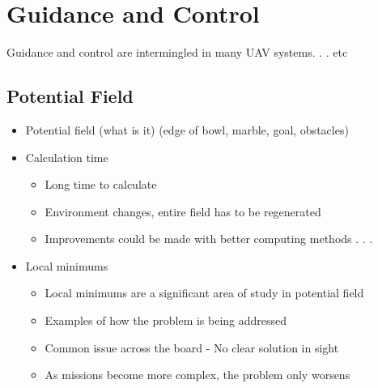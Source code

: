 \documentclass[numbered,pdftex]{ohio-etd}
\begin{document}
\section{Guidance and Control}

Guidance and control are intermingled in many UAV systems. . . etc




\subsection{Potential Field}
\begin{itemize}
	\item Potential field (what is it) (edge of bowl, marble, goal, obstacles)
	\item Calculation time
	\begin{itemize}
		\item Long time to calculate
		\item Environment changes, entire field has to be regenerated
		\item Improvements could be made with better computing methods . . .
	\end{itemize}
	
	\item Local minimums
	\begin{itemize}
		\item Local minimums are a significant area of study in potential field
		\item Examples of how the problem is being addressed
		\item Common issue across the board - No clear solution in sight
		\item As missions become more complex, the problem only worsens
	\end{itemize}
	
\end{itemize}
\end{document}

